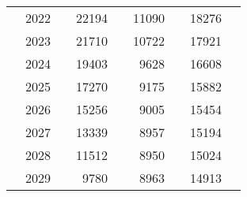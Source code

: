 \begin{table}
\begin{tabular}[t]{>{}l|l>{}rr>{}r|rrrr}
 & 2022 & \cellcolor[HTML]{B0A473}{\textcolor{white}{1200}} & 22194 & \cellcolor[HTML]{2A768E}{\textcolor{white}{0.608}} & 11090 & \cellcolor[HTML]{2E6D8E}{\textcolor{white}{0.646}} & 18276 & \cellcolor[HTML]{3A538B}{\textcolor{white}{0.746}}\\

 & 2023 & \cellcolor[HTML]{60646E}{\textcolor{white}{3817}} & 21710 & \cellcolor[HTML]{29798E}{\textcolor{white}{0.595}} & 10722 & \cellcolor[HTML]{2C728E}{\textcolor{white}{0.625}} & 17921 & \cellcolor[HTML]{38588C}{\textcolor{white}{0.731}}\\

 & 2024 & \cellcolor[HTML]{6B6C71}{\textcolor{white}{3418}} & 19403 & \cellcolor[HTML]{23898E}{\textcolor{white}{0.531}} & 9628 & \cellcolor[HTML]{26828E}{\textcolor{white}{0.561}} & 16608 & \cellcolor[HTML]{32658E}{\textcolor{white}{0.678}}\\

 & 2025 & \cellcolor[HTML]{707173}{\textcolor{white}{3246}} & 17270 & \cellcolor[HTML]{1F968B}{\textcolor{white}{0.473}} & 9175 & \cellcolor[HTML]{23888E}{\textcolor{white}{0.535}} & 15882 & \cellcolor[HTML]{2E6D8E}{\textcolor{white}{0.648}}\\

 & 2026 & \cellcolor[HTML]{727274}{\textcolor{white}{3165}} & 15256 & \cellcolor[HTML]{20A386}{\textcolor{white}{0.418}} & 9005 & \cellcolor[HTML]{238A8D}{\textcolor{white}{0.525}} & 15454 & \cellcolor[HTML]{2D718E}{\textcolor{white}{0.631}}\\

 & 2027 & \cellcolor[HTML]{737475}{\textcolor{white}{3117}} & 13339 & \cellcolor[HTML]{2AB07F}{\textcolor{white}{0.365}} & 8957 & \cellcolor[HTML]{228B8D}{\textcolor{white}{0.522}} & 15194 & \cellcolor[HTML]{2C738E}{\textcolor{white}{0.620}}\\

 & 2028 & \cellcolor[HTML]{747475}{\textcolor{white}{3073}} & 11512 & \cellcolor[HTML]{3DBC74}{\textcolor{white}{0.315}} & 8950 & \cellcolor[HTML]{228B8D}{\textcolor{white}{0.522}} & 15024 & \cellcolor[HTML]{2B758E}{\textcolor{white}{0.613}}\\

 & 2029 & \cellcolor[HTML]{767676}{\textcolor{white}{3028}} & 9780 & \cellcolor[HTML]{54C568}{\textcolor{white}{0.268}} & 8963 & \cellcolor[HTML]{228B8D}{\textcolor{white}{0.522}} & 14913 & \cellcolor[HTML]{2A768E}{\textcolor{white}{0.609}}\\


\end{tabular}
\end{table}
